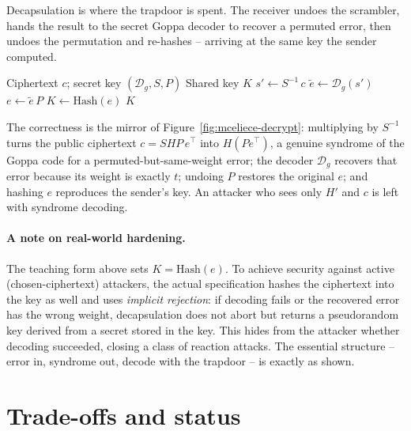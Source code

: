 Decapsulation is where the trapdoor is spent. The receiver undoes the scrambler, hands the result to the secret Goppa decoder to recover a permuted error, then undoes the permutation and re-hashes -- arriving at the same key the sender computed.

\begin{algorithm}[H]
\caption{Classic McEliece Decapsulate (teaching form)}
\label{alg:mce-decap}
\begin{algorithmic}[1]
\Require Ciphertext $c$; secret key $(\mathcal{D}_g, S, P)$
\Ensure Shared key $K$
\State $s' \gets S^{-1}\,c$ 
\State $\tilde e \gets \mathcal{D}_g(s')$ 
\State $e \gets \tilde e\,P$ 
\State $K \gets \mathrm{Hash}(e)$ 
\State \Return $K$
\end{algorithmic}
\end{algorithm}

The correctness is the mirror of Figure~\ref{fig:mceliece-decrypt}: multiplying by $S^{-1}$ turns the public ciphertext $c = SHP\,e^\top$ into $H(Pe^\top)$, a genuine syndrome of the Goppa code for a permuted-but-same-weight error; the decoder $\mathcal{D}_g$ recovers that error because its weight is exactly $t$; undoing $P$ restores the original $e$; and hashing $e$ reproduces the sender's key. An attacker who sees only $H'$ and $c$ is left with syndrome decoding.

\paragraph{A note on real-world hardening.}
The teaching form above sets $K = \mathrm{Hash}(e)$. To achieve security against active (chosen-ciphertext) attackers, the actual specification hashes the ciphertext into the key as well and uses \emph{implicit rejection}: if decoding fails or the recovered error has the wrong weight, decapsulation does not abort but returns a pseudorandom key derived from a secret stored in the key. This hides from the attacker whether decoding succeeded, closing a class of reaction attacks. The essential structure -- error in, syndrome out, decode with the trapdoor -- is exactly as shown.

\section{Trade-offs and status}

